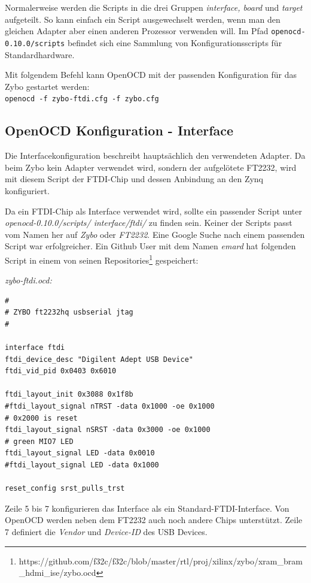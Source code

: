 Normalerweise werden die Scripts in die drei Gruppen \textit{interface, board} und \textit{target} aufgeteilt.
So kann einfach ein Script ausgewechselt werden, wenn man den gleichen Adapter aber einen anderen Prozessor verwenden will.
Im Pfad \texttt{openocd-0.10.0/scripts} befindet sich eine Sammlung von Konfigurationsscripts für Standardhardware.

Mit folgendem Befehl kann OpenOCD mit der passenden Konfiguration für das Zybo gestartet werden:\\
\texttt{openocd -f zybo-ftdi.cfg -f zybo.cfg}


\subsection{OpenOCD Konfiguration - Interface}
Die Interfacekonfiguration beschreibt hauptsächlich den verwendeten Adapter.
Da beim Zybo kein Adapter verwendet wird, sondern der aufgelötete FT2232, wird mit diesem Script der FTDI-Chip und dessen Anbindung an den Zynq konfiguriert.

Da ein FTDI-Chip als Interface verwendet wird, sollte ein passender Script unter \textit{openocd-0.10.0/scripts/ interface/ftdi/} zu finden sein.
Keiner der Scripts passt vom Namen her auf \textit{Zybo} oder \textit{FT2232}.
Eine Google Suche nach einem passenden Script war erfolgreicher.
Ein Github User mit dem Namen \textit{emard} hat folgenden Script in einem von seinen Repositories\footnote{https://github.com/f32c/f32c/blob/master/rtl/proj/xilinx/zybo/xram\_bram\_hdmi\_ise/zybo.ocd} gespeichert:

\textit{zybo-ftdi.ocd:}
\lstset{language=tcl}
\begin{lstlisting}[frame=single]
#
# ZYBO ft2232hq usbserial jtag
#

interface ftdi
ftdi_device_desc "Digilent Adept USB Device"
ftdi_vid_pid 0x0403 0x6010

ftdi_layout_init 0x3088 0x1f8b
#ftdi_layout_signal nTRST -data 0x1000 -oe 0x1000
# 0x2000 is reset
ftdi_layout_signal nSRST -data 0x3000 -oe 0x1000
# green MIO7 LED
ftdi_layout_signal LED -data 0x0010
#ftdi_layout_signal LED -data 0x1000

reset_config srst_pulls_trst

\end{lstlisting}

Zeile 5 bis 7 konfigurieren das Interface als ein Standard-FTDI-Interface.
Von OpenOCD werden neben dem FT2232 auch noch andere Chips unterstützt.
Zeile 7 definiert die \textit{Vendor} und \textit{Device-ID} des USB Devices.


